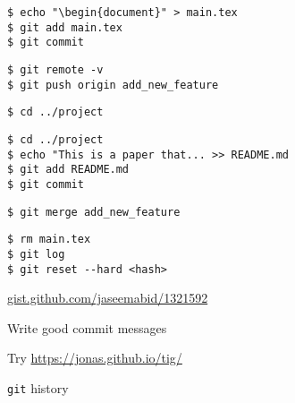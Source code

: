 \documentclass{beamer}
\begin{document}
\begin{frame}[fragile]{}
    \begin{verbatim}
$ echo "\begin{document}" > main.tex
$ git add main.tex
$ git commit
    \end{verbatim}
\end{frame}

\begin{frame}[fragile]{}
    \begin{verbatim}
$ git remote -v
$ git push origin add_new_feature
    \end{verbatim}
\end{frame}

\begin{frame}[fragile]{}
    \begin{verbatim}
$ cd ../project
    \end{verbatim}
\end{frame}

\begin{frame}[fragile]{}
    \begin{verbatim}
$ cd ../project
$ echo "This is a paper that... >> README.md
$ git add README.md
$ git commit
    \end{verbatim}
\end{frame}

\begin{frame}[fragile]{}
    \begin{verbatim}
$ git merge add_new_feature
    \end{verbatim}
\end{frame}

\begin{frame}[fragile]{}
    \begin{verbatim}
$ rm main.tex
$ git log
$ git reset --hard <hash>
    \end{verbatim}
\end{frame}

\begin{frame}[fragile]{}
    \begin{center}
        \Large
        \url{gist.github.com/jaseemabid/1321592}
    \end{center}
\end{frame}

\begin{frame}
    \Large
    \begin{center}
    Write good commit messages
    \end{center}
\end{frame}

\begin{frame}
    \Large
    \begin{center}
    Try \url{https://jonas.github.io/tig/}
    \end{center}
\end{frame}

\begin{frame}
    \Huge
    \begin{center}
    \texttt{git} history
    \end{center}
\end{frame}
\end{document}
